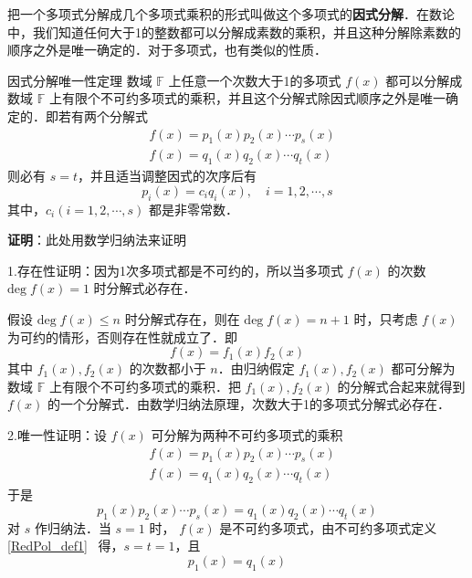 
把一个多项式分解成几个多项式乘积的形式叫做这个多项式的\textbf{因式分解}．在数论中，我们知道任何大于1的整数都可以分解成素数的乘积，并且这种分解除素数的顺序之外是唯一确定的．对于多项式，也有类似的性质．
\begin{theorem}{因式分解唯一性定理}
数域 $\mathbb{F}$ 上任意一个次数大于1的多项式 $f(x)$ 都可以分解成数域 $\mathbb{F}$ 上有限个不可约多项式的乘积，并且这个分解式除因式顺序之外是唯一确定的．即若有两个分解式
 \begin{equation}
 \begin{aligned}
 &f(x)=p_1(x)p_2(x)\cdots p_s(x)\\
 &f(x)=q_1(x)q_2(x)\cdots q_t(x)
 \end{aligned}
 \end{equation}
 则必有 $s=t$，并且适当调整因式的次序后有
 \begin{equation}
 p_i(x)=c_iq_i(x),\quad i=1,2,\cdots,s
 \end{equation}
 其中，$c_i(i=1,2,\cdots,s)$ 都是非零常数．
\end{theorem}
\textbf{证明}：此处用数学归纳法来证明

1.存在性证明：因为1次多项式都是不可约的，所以当多项式 $f(x)$ 的次数 $\mathrm{deg}\;f(x)=1$ 时分解式必存在．

假设 $\mathrm{deg}\;f(x)\leq n$ 时分解式存在，则在 $\mathrm{deg}\;f(x)=n+1$ 时，只考虑 $f(x)$ 为可约的情形，否则存在性就成立了．即
\begin{equation}
f(x)=f_1(x)f_2(x)
\end{equation}
其中 $f_1(x),f_2(x)$ 的次数都小于 $n$．由归纳假定 $f_1(x),f_2(x)$ 都可分解为数域 $\mathbb{F}$ 上有限个不可约多项式的乘积．把 $f_1(x),f_2(x)$ 的分解式合起来就得到 $f(x)$ 的一个分解式．由数学归纳法原理，次数大于1的多项式分解式必存在．

 2.唯一性证明：设 $f(x)$ 可分解为两种不可约多项式的乘积
 \begin{equation}
 \begin{aligned}
 &f(x)=p_1(x)p_2(x)\cdots p_s(x)\\
 &f(x)=q_1(x)q_2(x)\cdots q_t(x)
 \end{aligned}
 \end{equation}
 于是
 \begin{equation}\label{UniFac_eq1}
 p_1(x)p_2(x)\cdots p_s(x)=q_1(x)q_2(x)\cdots q_t(x)
 \end{equation}
 对 $s$ 作归纳法．当 $s=1$ 时， $f(x)$ 是不可约多项式，由不可约多项式定义\autoref{RedPol_def1}~ 得，$s=t=1$，且
 \begin{equation}
 p_1(x)=q_1(x)
 \end{equation}
 
